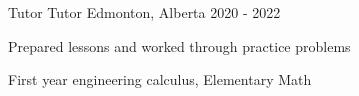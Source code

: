 \begin{cventries}
\cventry
{Tutor} %
{Tutor} %
{Edmonton, Alberta} %
{2020 - 2022} %
{
  \begin{cvitems} %
    \item Prepared lessons and worked through practice problems
    \item First year engineering calculus, Elementary Math
  \end{cvitems}
}







\end{cventries}
